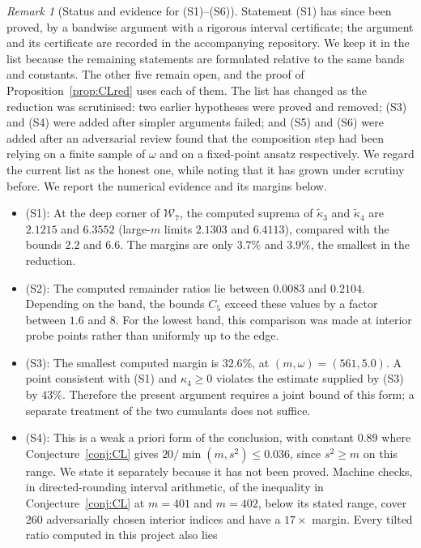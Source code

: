 \documentclass[11pt]{amsart}
\theoremstyle{plain}
\theoremstyle{definition}
\theoremstyle{remark}
\newtheorem{remark}[theorem]{Remark}
\begin{document}
\begin{remark}[Status and evidence for (S1)--(S6)]
\label{rem:S-evidence}
Statement (S1) has since been proved, by a bandwise argument with a
rigorous interval certificate; the argument and its certificate are
recorded in the accompanying repository. We keep it in the list because the remaining statements are formulated relative to the same bands and constants. The other five remain open, and the proof of
Proposition~\ref{prop:CLred} uses each of them. The list has changed as the
reduction was scrutinised: two earlier hypotheses were proved and removed;
(S3) and (S4) were added after simpler arguments failed; and (S5) and (S6)
were added after an adversarial review found that the composition step had
been relying on a finite sample of $\omega$ and on a fixed-point ansatz
respectively. We regard the current list as the honest one, while noting
that it has grown under scrutiny before. We report the numerical evidence and its margins below.
\begin{itemize}
\item (S1): At the deep corner of $\mathcal W_7$, the computed suprema of
$\tilde\kappa_3$ and $\tilde\kappa_4$ are $2.1215$ and $6.3552$
(large-$m$ limits $2.1303$ and $6.4113$), compared with the bounds $2.2$
and $6.6$. The margins are only $3.7\%$ and $3.9\%$, the smallest in the
reduction.
\item (S2): The computed remainder ratios lie between $0.0083$ and
$0.2104$. Depending on the band, the bounds $C_5$ exceed these values by
a factor between $1.6$ and $8$. For the lowest band, this comparison was
made at interior probe points rather than uniformly up to the edge.
\item (S3): The smallest computed margin is $32.6\%$, at
$(m,\omega)=(561,5.0)$. A point consistent with (S1) and
$\kappa_4\ge0$ violates the estimate supplied by (S3) by $43\%$.
Therefore the present argument requires a joint bound of this form; a
separate treatment of the two cumulants does not suffice.
\item (S4): This is a weak a priori form of the conclusion, with constant
$0.89$ where Conjecture~\ref{conj:CL} gives
$20/\min(m,s^2)\le0.036$, since $s^2\ge m$ on this range. We state it
separately because it has not been proved. Machine checks, in
directed-rounding interval arithmetic, of the inequality
in Conjecture~\ref{conj:CL} at $m=401$ and $m=402$, below its stated
range, cover $260$ adversarially chosen interior indices and have a
$17\times$ margin. Every tilted ratio computed in this project also lies

\end{itemize}
\end{remark}
\end{document}
